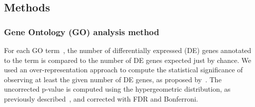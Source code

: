 
 

\subsection{Methods}


\subsubsection{Gene Ontology (GO) analysis method}  

For each GO term~\cite{ashburner2002ontologies, gene2004gene}, the number of differentially expressed (DE) genes annotated to the term is compared to the number of DE genes expected just by chance. We used  an over-representation approach to compute the statistical significance of observing at least the given number of DE genes, as proposed by~\cite{Tavazoie:1999}. The uncorrected p-value is computed using the hypergeometric distribution, as previously described~\cite{DraghiciOE2:2003,DraghiciBook:2011}, and corrected with FDR and Bonferroni.

